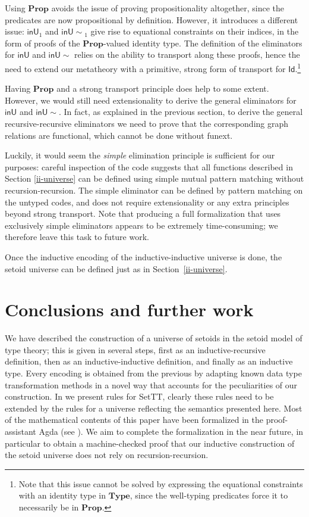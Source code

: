 \documentclass[autoref]{llncs}
\newcommand{\inU}{\mathsf{inU}}
\newcommand{\inUU}{\mathsf{inU{\sim}}}
\newcommand{\mType}{\mathbf{Type}}
\newcommand{\mProp}{\mathbf{Prop}}
\begin{document}
Using $\mProp$ avoids the issue of proving propositionality altogether, since the
predicates are now propositional by definition.
%
However, it introduces a different issue: $\inU_1$ and $\inUU_1$ give
rise to equational constraints on their indices, in the form of proofs of the
$\mProp$-valued identity type. The definition of the eliminators for $\inU$
and $\inUU$ relies on the ability to transport along these proofs, hence
the need to extend our metatheory with a primitive, strong form of transport for
$\textsf{Id}$.\footnote{Note that this issue cannot be solved by expressing the
  equational constraints with an identity type in $\mType$, since the
  well-typing predicates force it to necessarily be in $\mProp$.}

Having $\mProp$ and a strong transport principle does help to some extent.
%
However, we would still need extensionality to derive the general eliminators
for $\inU$ and $\inUU$. In fact, as explained in the previous section,
to derive the general recursive-recursive eliminators we need to prove that the
corresponding graph relations are functional, which cannot be done without funext.

Luckily, it would seem the \emph{simple} elimination principle is sufficient for
our purposes: careful inspection of the code suggests that all functions
described in Section \ref{ii-universe} can be defined using simple mutual
pattern matching without recursion-recursion. The simple eliminator can be
defined by pattern matching on the untyped codes, and does not require
extensionality or any extra principles beyond strong transport. Note that
producing a full formalization that uses exclusively simple eliminators appears
to be extremely time-consuming; we therefore leave this task to future work.

Once the inductive encoding of the inductive-inductive universe is done, the
setoid universe can be defined just as in Section~\ref{ii-universe}.

\section{Conclusions and further work}\label{further-work}

We have described the construction of a universe of setoids in the setoid model
of type theory; this is given in several steps, first as an inductive-recursive
definition, then as an inductive-inductive definition, and finally as an
inductive type. Every encoding is obtained from the previous by adapting known
data type transformation methods in a novel way that accounts for the
peculiarities of our construction. In \cite{mpc19} we present rules
for SetTT, clearly these rules need to be extended by the rules for a
universe reflecting the semantics presented here.
%
Most of the mathematical contents of this paper have been formalized in the
proof-assistant Agda (see \cite{agda-code}). We aim to complete the
formalization in the near future, in particular to obtain a machine-checked
proof that our inductive construction of the setoid universe does not rely on
recursion-recursion.
\end{document}

